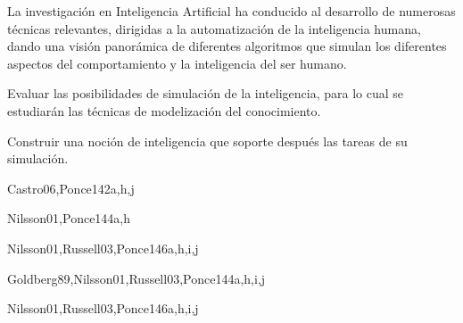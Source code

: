 \begin{syllabus}


\begin{justification}
La investigación en Inteligencia Artificial ha conducido al desarrollo de
numerosas técnicas relevantes, dirigidas a la automatización de la
inteligencia humana, dando una visión panorámica de diferentes
algoritmos que simulan los diferentes aspectos del comportamiento
y la inteligencia del ser humano.
\end{justification}

\begin{goals}
\item Evaluar las posibilidades de simulación de la inteligencia, para lo cual se estudiarán las técnicas de modelización del conocimiento.
\item Construir una noción de inteligencia que soporte después las tareas de su simulación.
\end{goals}

\begin{outcomes}
\end{outcomes}

\begin{unit}{\ISFundamentalIssuesDef}{Castro06,Ponce14}{2}{a,h,j}
    \ISFundamentalIssuesAllTopics
    \ISFundamentalIssuesAllObjectives
\end{unit}

\begin{unit}{\ISBasicSearchStrategiesDef}{Nilsson01,Ponce14}{4}{a,h}
    \ISBasicSearchStrategiesAllTopics
    \ISBasicSearchStrategiesAllObjectives
\end{unit}

\begin{unit}{\ISKnowledgementBasedReasoningDef}{Nilsson01,Russell03,Ponce14}{6}{a,h,i,j}
    \ISKnowledgementBasedReasoningAllTopics
    \ISKnowledgementBasedReasoningAllObjectives
\end{unit}

\begin{unit}{\ISAdvancedSearchDef}{Goldberg89,Nilsson01,Russell03,Ponce14}{4}{a,h,i,j}
     \ISAdvancedSearchAllTopics
     \ISAdvancedSearchAllObjectives
\end{unit}

\begin{unit}{\ISAdvancedReasoningDef}{Nilsson01,Russell03,Ponce14}{6}{a,h,i,j}
    \ISAdvancedReasoningAllTopics
    \ISAdvancedReasoningAllObjectives
\end{unit}


\end{syllabus}
